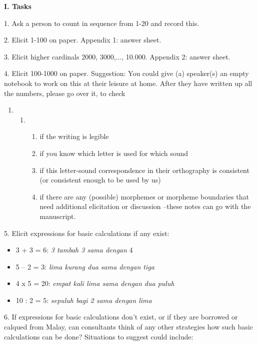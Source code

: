 \textbf{I. Tasks}

1. Ask a person to count in sequence from 1-20 and record this.

2. Elicit 1-100 on paper. Appendix 1: answer sheet.

3. Elicit higher cardinals 2000, 3000,..., 10.000. Appendix 2: answer sheet. 

4. Elicit 100-1000 on paper. Suggestion: You could give (a) speaker(s) an empty  notebook to work on this at their leisure at home. After they have written up all the numbers, please go over it, to check 

\begin{enumerate}
\item \begin{enumerate}
\item \begin{enumerate}
\item if the writing is legible 
\item if you know which letter is used for which sound
\item if this letter-sound correspondence in their orthography is consistent (or consistent enough to be used by us) 
\item if there are any (possible) morphemes or morpheme boundaries that need additional elicitation or discussion --these notes can go with the manuscript.
\end{enumerate}
\end{enumerate}
\end{enumerate}
5. Elicit expressions for basic calculations if any exist: 

\begin{itemize}
\item 3 + 3 = 6: \textit{3 tambah 3 sama dengan }4
\item 5 -- 2 = 3: \textit{lima kurang dua sama dengan tiga}
\item 4 x 5 = 20: \textit{empat kali lima sama dengan dua puluh}
\item 10 : 2 = 5: \textit{sepuluh bagi 2 sama dengan lima} 
\end{itemize}
6. If expressions for basic calculations don{\textquoteright}t exist, or if they are borrowed or calqued from Malay, can consultants think of any other strategies how such basic calculations can be done? Situations to suggest could include:

